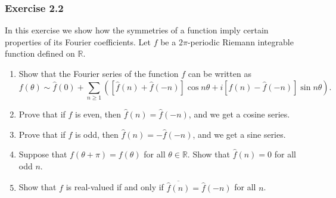 \documentclass[letterpaper, 12pt]{article}
\newcommand{\R}{\mathbb{R}}
\begin{document}
\subsubsection{Exercise 2.2}
\begin{tcolorbox}
  In this exercise we show how the symmetries of
  a function imply certain properties of its Fourier
  coefficients. Let $f$ be a $2\pi$-periodic Riemann
  integrable function defined on $\R$.
  \begin{enumerate}
    \item Show that the Fourier series of the function
      $f$ can be written as
      \[
        f(\theta) \sim \hat{f}(0)
        + \sum_{n \ge 1} \left([\hat{f}(n) + \hat{f}(-n)] \cos n\theta + i [\hat{f}(n) - \hat{f}(-n)] \sin n\theta\right).
      \]
    \item Prove that if $f$ is even, then
      $\hat{f}(n) = \hat{f}(-n)$, and we get a cosine
      series.
    \item Prove that if $f$ is odd, then
      $\hat{f}(n) = -\hat{f}(-n)$, and we get a sine
      series.
    \item Suppose that $f(\theta + \pi) = f(\theta)$
      for all $\theta \in \R$. Show that
      $\hat{f}(n) = 0$ for all odd $n$.
    \item Show that $f$ is real-valued if and only if
      $\overline{\hat{f}(n)} = \hat{f}(-n)$ for all
      $n$.
  \end{enumerate}
\end{tcolorbox}
\end{document}
